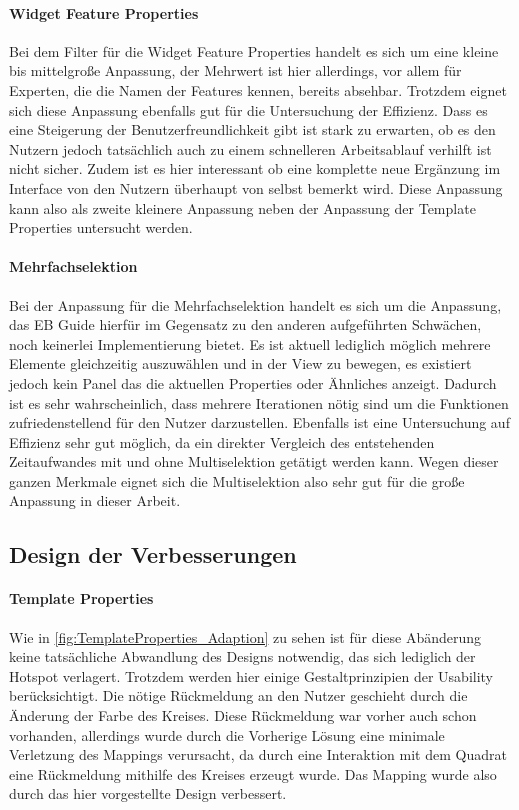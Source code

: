 \paragraph{Widget Feature Properties}
Bei dem Filter für die Widget Feature Properties handelt es sich um eine kleine bis mittelgroße Anpassung, der Mehrwert ist hier allerdings, vor allem für Experten, die die Namen der Features kennen, bereits absehbar.
Trotzdem eignet sich diese Anpassung ebenfalls gut für die Untersuchung der Effizienz.
Dass es eine Steigerung der Benutzerfreundlichkeit gibt ist stark zu erwarten, ob es den Nutzern jedoch tatsächlich auch zu einem schnelleren Arbeitsablauf verhilft ist nicht sicher.
Zudem ist es hier interessant ob eine komplette neue Ergänzung im Interface von den Nutzern überhaupt von selbst bemerkt wird.
Diese Anpassung kann also als zweite kleinere Anpassung neben der Anpassung der Template Properties untersucht werden.

\paragraph{Mehrfachselektion}
Bei der Anpassung für die Mehrfachselektion handelt es sich um die Anpassung, das EB Guide hierfür im Gegensatz zu den anderen aufgeführten Schwächen, noch keinerlei Implementierung bietet.
Es ist aktuell lediglich möglich mehrere Elemente gleichzeitig auszuwählen und in der View zu bewegen, es existiert jedoch kein Panel das die aktuellen Properties oder Ähnliches anzeigt.
Dadurch ist es sehr wahrscheinlich, dass mehrere Iterationen nötig sind um die Funktionen zufriedenstellend für den Nutzer darzustellen.
Ebenfalls ist eine Untersuchung auf Effizienz sehr gut möglich, da ein direkter Vergleich des entstehenden Zeitaufwandes mit und ohne Multiselektion getätigt werden kann.
Wegen dieser ganzen Merkmale eignet sich die Multiselektion also sehr gut für die große Anpassung in dieser Arbeit.

\subsection{Design der Verbesserungen}

\paragraph{Template Properties}

Wie in \cref{fig:TemplateProperties_Adaption} zu sehen ist für diese Abänderung keine tatsächliche Abwandlung des Designs notwendig, das sich lediglich der Hotspot verlagert.
Trotzdem werden hier einige Gestaltprinzipien der Usability berücksichtigt.
Die nötige Rückmeldung an den Nutzer geschieht durch die Änderung der Farbe des Kreises.
Diese Rückmeldung war vorher auch schon vorhanden, allerdings wurde durch die Vorherige Lösung eine minimale Verletzung des Mappings verursacht, da durch eine Interaktion mit dem Quadrat eine Rückmeldung mithilfe des Kreises erzeugt wurde. 
Das Mapping wurde also durch das hier vorgestellte Design verbessert.

